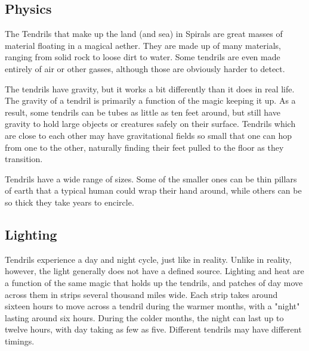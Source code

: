\begin{multicols*}{2}
\section{Physics}
The Tendrils that make up the land (and sea) in Spirals are great masses of material floating in a magical aether.
They are made up of many materials, ranging from solid rock to loose dirt to water.
Some tendrils are even made entirely of air or other gasses, although those are obviously harder to detect.

The tendrils have gravity, but it works a bit differently than it does in real life.
The gravity of a tendril is primarily a function of the magic keeping it up.
As a result, some tendrils can be tubes as little as ten feet around, but still have gravity to hold large objects or creatures safely on their surface.
Tendrils which are close to each other may have gravitational fields so small that one can hop from one to the other, naturally finding their feet pulled to the floor as they transition.

Tendrils have a wide range of sizes. 
Some of the smaller ones can be thin pillars of earth that a typical human could wrap their hand around, while others can be so thick they take years to encircle.

\subsection*{Lighting}
Tendrils experience a day and night cycle, just like in reality.
Unlike in reality, however, the light generally does not have a defined source.
Lighting and heat are a function of the same magic that holds up the tendrils, and patches of day move across them in strips several thousand miles wide.
Each strip takes around sixteen hours to move across a tendril during the warmer months, with a "night" lasting around six hours.
During the colder months, the night can last up to twelve hours, with day taking as few as five.
Different tendrils may have different timings.


\end{multicols*}

